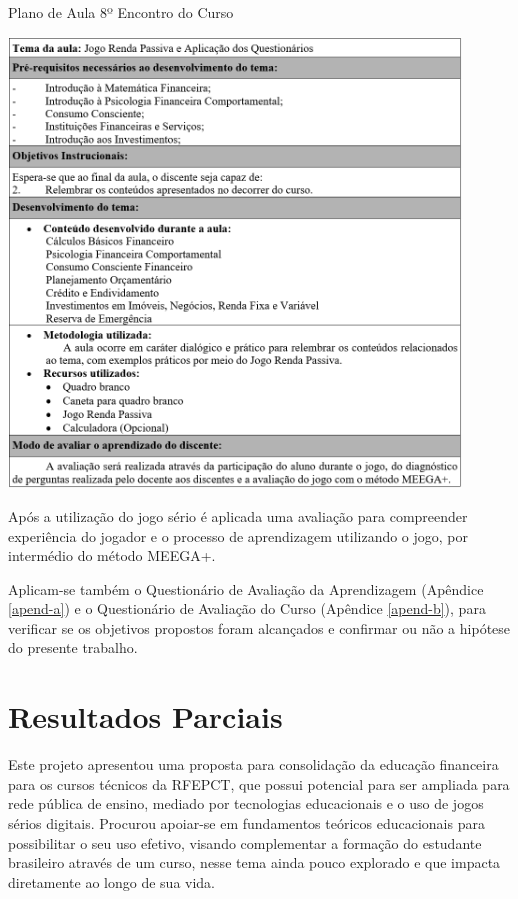\graphicspath{{quadros/}} 
\begin{quadro}[!ht]
\centering
\begin{minipage}{1.\textwidth}
\caption{Plano de Aula 8º Encontro do Curso}
\centering
\includegraphics[width=0.9\textwidth]{quadro-14_plano-aula-8}
\label{quad: quadro-14_plano-aula-8}
\end{minipage}
\end{quadro}

Após a utilização do jogo sério é aplicada uma avaliação para compreender experiência do jogador e o processo de aprendizagem utilizando o jogo, por intermédio do método MEEGA+.

Aplicam-se também o Questionário de Avaliação da Aprendizagem (Apêndice \ref{apend-a}) e o Questionário de Avaliação do Curso (Apêndice \ref{apend-b}), para verificar se os objetivos propostos foram alcançados e confirmar ou não a hipótese do presente trabalho.

\chapter{Resultados Parciais}
Este projeto apresentou uma proposta para consolidação da educação financeira para os cursos técnicos da RFEPCT, que possui potencial para ser ampliada para rede pública de ensino, mediado por tecnologias educacionais e o uso de jogos sérios digitais. Procurou apoiar-se em fundamentos teóricos educacionais para possibilitar o seu uso efetivo, visando complementar a formação do estudante brasileiro através de um curso, nesse tema ainda pouco explorado e que impacta diretamente ao longo de sua vida.


